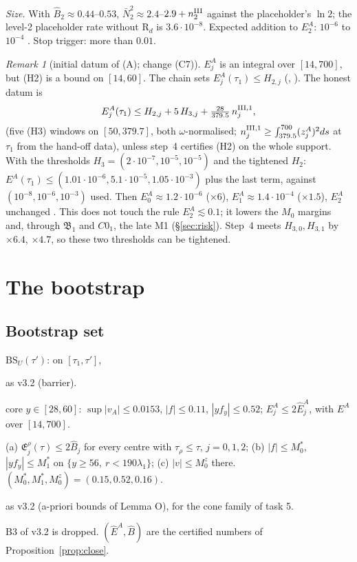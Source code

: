 \documentclass[11pt]{article}
\theoremstyle{definition}\newtheorem{definition}[theorem]{Definition}
\theoremstyle{remark}\newtheorem{remark}[theorem]{Remark}
\newcommand{\fn}[1]{\texttt{\detokenize{#1}}}
\newcommand{\E}{\mathfrak E}\newcommand{\B}{\mathfrak B}\newcommand{\Bh}{\hat B}\newcommand{\Eh}{\hat E^A}
\newcommand{\Nb}{\bar N}\newcommand{\oh}{\hat o}
\begin{document}
\noindent\emph{Size.} With $\Bh_2\approx0.44$--$0.53$, $\Nb_2^2\approx2.4$--$2.9+n^{\rm III}_2$ against the placeholder's $\ln2$; the level-2 placeholder rate without R$_d$ is $3.6\cdot10^{-8}$. Expected addition to $E_2^A$: $10^{-6}$ to $10^{-4}$ \tE. Stop trigger: more than $0.01$.
\begin{remark}[initial datum of (A); change (C7)]\label{rem:IC}
$E^A_j$ is an integral over $[14,700]$, but (H2) is a bound on $[14,60]$. The chain sets $E^A_j(\tau_1)\le H_{2,j}$ (\fn{export_for_U.py}, \fn{assembly_rep.py}). The honest datum is
\[
E^A_j(\tau_1)\le H_{2,j}+5\,H_{3,j}+\tfrac{28}{379.5}\,n^{{\rm III},1}_j ,
\]
(five (H3) windows on $[50,379.7]$, both $\omega$-normalised; $n^{{\rm III},1}_j\ge\int_{379.5}^{700}(z_j^A)^2ds$ at $\tau_1$ from the hand-off data), unless step~4 certifies (H2) on the whole support. With the thresholds $H_3=(2\cdot10^{-7},10^{-5},10^{-5})$ and the tightened $H_2$: $E^A(\tau_1)\le(1.01\cdot10^{-6},5.1\cdot10^{-5},1.05\cdot10^{-3})$ plus the last term, against $(10^{-8},10^{-6},10^{-3})$ used. Then $E_0^A\approx1.2\cdot10^{-6}$ ($\times6$), $E_1^A\approx1.4\cdot10^{-4}$ ($\times1.5$), $E_2^A$ unchanged \tE. This does not touch the rule $E_2^A\lesssim0.1$; it lowers the $M_0$ margins and, through $\B_1$ and $C0_1$, the late M1 (\S\ref{sec:risk}). Step~4 meets $H_{3,0},H_{3,1}$ by $\times6.4$, $\times4.7$, so these two thresholds can be tightened.
\end{remark}

\section{The bootstrap}\label{sec:boot}
\subsection{Bootstrap set}
$\mathrm{BS}_U(\tau')$: on $[\tau_1,\tau']$,
\begin{description}[leftmargin=1.2em,itemsep=1pt]
\item[B1] as v3.2 (barrier).
\item[B2$'$] core $y\in[28,60]$: $\sup|v_A|\le0.0153$, $|f|\le0.11$, $|yf_y|\le0.52$; $E^A_j\le2\Eh_j$, with $E^A$ over $[14,700]$.
\item[B3U] (a) $\E^\rho_j(\tau)\le2\Bh_j$ for every centre with $\tau_\rho\le\tau$, $j=0,1,2$; (b) $|f|\le M_0^*$, $|yf_y|\le M_1^*$ on $\{y\ge56,\ r<190\lambda_1\}$; (c) $|v|\le M_0^z$ there. $(M_0^*,M_1^*,M_0^z)=(0.15,0.52,0.16)$.
\item[B4] as v3.2 (a-priori bounds of Lemma O), for the cone family of task 5.
\end{description}
B3 of v3.2 is dropped. $(\Eh,\Bh)$ are the certified numbers of Proposition~\ref{prop:close}.
\end{document}
